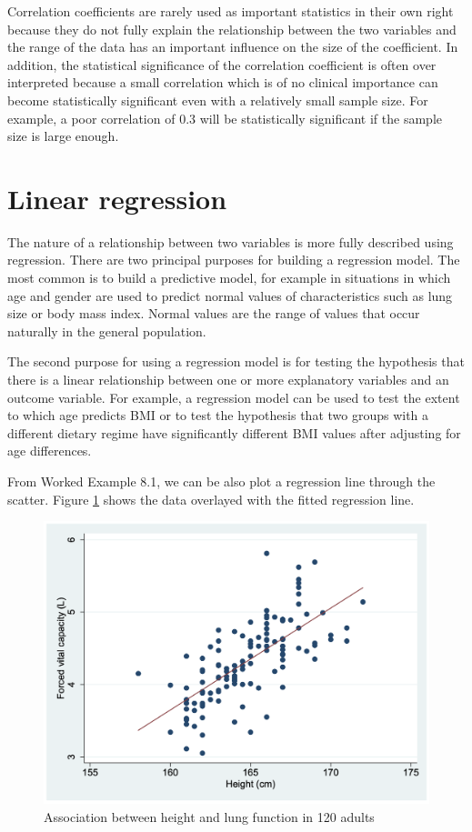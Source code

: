\documentclass[
]{memoir}
\begin{document}
Correlation coefficients are rarely used as important statistics in their own right because they do not fully explain the relationship between the two variables and the range of the data has an important influence on the size of the coefficient. In addition, the statistical significance of the correlation coefficient is often over interpreted because a small correlation which is of no clinical importance can become statistically significant even with a relatively small sample size. For example, a poor correlation of 0.3 will be statistically significant if the sample size is large enough.

\hypertarget{linear-regression}{%
\section{Linear regression}\label{linear-regression}}

The nature of a relationship between two variables is more fully described using regression. There are two principal purposes for building a regression model. The most common is to build a predictive model, for example in situations in which age and gender are used to predict normal values of characteristics such as lung size or body mass index. Normal values are the range of values that occur naturally in the general population.

The second purpose for using a regression model is for testing the hypothesis that there is a linear relationship between one or more explanatory variables and an outcome variable. For example, a regression model can be used to test the extent to which age predicts BMI or to test the hypothesis that two groups with a different dietary regime have significantly different BMI values after adjusting for age differences.

From Worked Example 8.1, we can be also plot a regression line through the scatter. Figure \ref{fig:scatter-plot-line} shows the data overlayed with the fitted regression line.

\begin{figure}
\includegraphics[width=0.66\linewidth]{img/mod08/scatterplot-line-fvc-height} \caption{Association between height and lung function in 120 adults}\label{fig:scatter-plot-line}
\end{figure}
\end{document}

